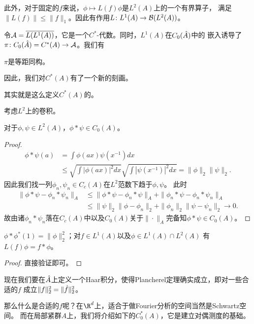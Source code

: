 此外，对于固定的$f$来说，$\phi \mapsto L(f)\phi$是$L^2(A)$上的一个有界算子，
满足$\|L(f)\| \leqslant \|f\|_1$。因此有作用$L\colon L^1(A) \to \mathcal{B}(L^2(A))$。

令$\mathcal{A} = \overline{L(L^1(A))}$，它是一个$C^*$-代数。同时，$L^1(A)$在$C_0(\hat{A})$中的
嵌入诱导了$\pi \colon C_0(\hat{A}) = C^*(A) \to \mathcal{A}$。我们有
\begin{theorem}
    $\pi$是等距同构。
\end{theorem}
因此，我们对$C^*(A)$有了一个新的刻画。
\begin{remark}
    其实\cite{Pr}就是这么定义$C^*(A)$的。
\end{remark}

考虑$L^2$上的卷积。
\begin{proposition}
    对于$\phi,\psi \in L^2(A)$，$\phi*\psi \in C_0(A)$。
\end{proposition}
\begin{proof}
    \begin{align*}
\phi*\psi(a) & = \int \phi(ax)\psi(x^{-1})dx \\
& \leqslant \sqrt{\int |\phi(ax)|^2 dx}\sqrt{\int |\psi(x^{-1})|^2 dx} = \|\phi\|_2\|\psi\|_2.
\end{align*}
        因此我们找一列$\phi_n,\psi_n \in C_c(A)$在$L^2$范数下趋于$\phi,\psi$。
        此时\begin{align*}
            \|\phi*\psi - \phi_n*\psi_n\|_A & \leqslant \|\phi*\psi - \phi_n*\psi\|_A+\|\phi_n*\psi-\phi_n*\psi_n\|_A\\ 
            & \leqslant \|\psi\|_2\|\phi-\phi_n\|_2+\|\phi_n\|_2\|\psi - \psi_n\|_2 \to 0.
        \end{align*}
        故由诸$\phi_n*\psi_n$落在$C_c(A)$中以及$C_0(A)$关于$\|\cdot\|_A$完备知$\phi*\psi \in C_0(A)$。
\end{proof}
\begin{proposition}
    $\phi*\phi^*(1) = \|\phi\|_2^2$；对$f \in L^1(A)$以及$\phi \in L^1(A) \cap L^2(A)$
    有$L(f)\phi = f*\phi$。
\end{proposition}
\begin{proof}
    直接验证即可。
\end{proof}

现在我们要在$\hat{A}$上定义一个Haar积分，使得Plancherel定理确实成立，即对一些合适的$f$
成立$\|f\|_2^2 = \|\hat{f}\|_2^2$。

那么什么是合适的$f$呢？在$\R^d$上，适合于做Fourier分析的空间当然是Schwartz空间。
而在局部紧群$A$上，我们将介绍如下的$C_0^*(A)$，它是建立对偶测度的基础。


